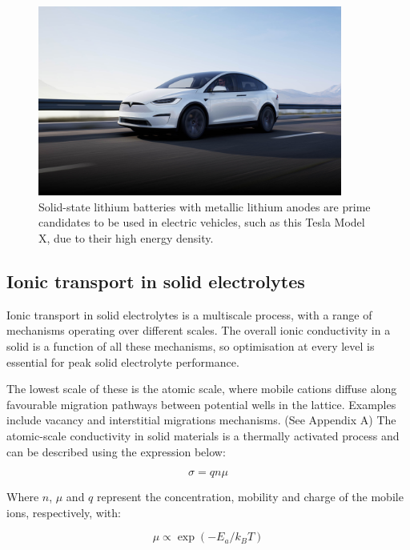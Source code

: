 \documentclass[12pt]{report}
\begin{document}
\begin{figure}
    \centering
    \includegraphics[width=10cm]{figures/tesla.jpeg}
    \caption{Solid-state lithium batteries with metallic lithium anodes are prime candidates to be used in electric vehicles, such as this Tesla Model X, due to their high energy density.}
    \label{tesla}
\end{figure}

\subsection{Ionic transport in solid electrolytes}

Ionic transport in solid electrolytes is a multiscale process, with a range of mechanisms operating over different scales. 
The overall ionic conductivity in a solid is a function of all these mechanisms, so optimisation at every level is essential for peak solid electrolyte performance.\cite{famprikis2019} 

The lowest scale of these is the atomic scale, where mobile cations diffuse along favourable migration pathways between potential wells in the lattice. 
Examples include vacancy and interstitial migrations mechanisms. (See Appendix A)
The atomic-scale conductivity in solid materials is a thermally activated process and can be described using the expression below:

\begin{equation}
    \sigma = q n \mu
\end{equation}

\noindent
Where $n$, $ \mu $ and $q$ represent the concentration, mobility and charge of the mobile ions, respectively, with: 

\begin{equation}
    \mu \propto \exp(-E_a/k_BT)
\end{equation}

\noindent
\end{document}
